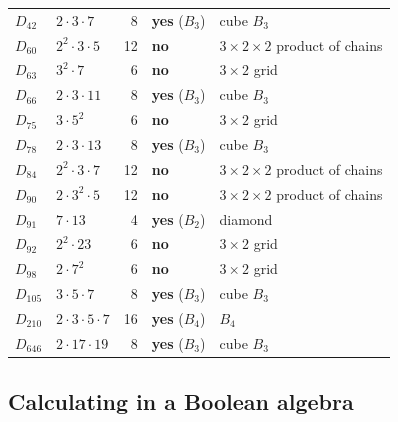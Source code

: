 \documentclass{fkt-notes}
\theoremstyle{definition}
\begin{document}
\begin{center}
\begin{tabular}{@{}llrll@{}}
    $D_{42}$  & $2 \cdot 3 \cdot 7$         & 8    & \textbf{yes} ($B_3$) & cube $B_3$                          \\
    $D_{60}$  & $2^2 \cdot 3 \cdot 5$       & 12   & \textbf{no}          & $3\times2\times2$ product of chains \\
    $D_{63}$  & $3^2 \cdot 7$               & 6    & \textbf{no}          & $3\times2$ grid                     \\
    $D_{66}$  & $2 \cdot 3 \cdot 11$        & 8    & \textbf{yes} ($B_3$) & cube $B_3$                          \\
    $D_{75}$  & $3 \cdot 5^2$               & 6    & \textbf{no}          & $3\times2$ grid                     \\
    $D_{78}$  & $2 \cdot 3 \cdot 13$        & 8    & \textbf{yes} ($B_3$) & cube $B_3$                          \\
    $D_{84}$  & $2^2 \cdot 3 \cdot 7$       & 12   & \textbf{no}          & $3\times2\times2$ product of chains \\
    $D_{90}$  & $2 \cdot 3^2 \cdot 5$       & 12   & \textbf{no}          & $3\times2\times2$ product of chains \\
    $D_{91}$  & $7 \cdot 13$                & 4    & \textbf{yes} ($B_2$) & diamond                             \\
    $D_{92}$  & $2^2 \cdot 23$              & 6    & \textbf{no}          & $3\times2$ grid                     \\
    $D_{98}$  & $2 \cdot 7^2$               & 6    & \textbf{no}          & $3\times2$ grid                     \\
    $D_{105}$ & $3 \cdot 5 \cdot 7$         & 8    & \textbf{yes} ($B_3$) & cube $B_3$                          \\
    $D_{210}$ & $2 \cdot 3 \cdot 5 \cdot 7$ & 16   & \textbf{yes} ($B_4$) & $B_4$                               \\
    $D_{646}$ & $2 \cdot 17 \cdot 19$       & 8    & \textbf{yes} ($B_3$) & cube $B_3$                          \\
    \bottomrule
  \end{tabular}
\end{center}

\subsection{Calculating in a Boolean algebra}
%
\end{document}
